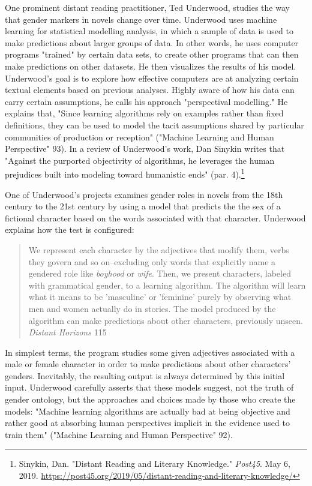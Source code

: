 \documentclass[11pt]{article}
\begin{document}
One prominent distant reading practitioner, Ted Underwood, studies the
way that gender markers in novels change over time. Underwood uses
machine learning for statistical modelling analysis, in which a sample
of data is used to make predictions about larger groups of data. In
other words, he uses computer programs "trained" by certain data sets,
to create other programs that can then make predictions on other
datasets. He then visualizes the results of his model. Underwood's
goal is to explore how effective computers are at analyzing certain
textual elements based on previous analyses. Highly aware of how his
data can carry certain assumptions, he calls his approach
"perspectival modelling." He explains that, "Since learning algorithms
rely on examples rather than fixed definitions, they can be used to
model the tacit assumptions shared by particular communities of
production or reception" ("Machine Learning and Human Perspective"
93). In a review of Underwood's work, Dan Sinykin writes that "Against
the purported objectivity of algorithms, he leverages the human
prejudices built into modeling toward humanistic ends" (par. 4).\footnote{Sinykin, Dan. "Distant Reading and Literary Knowledge."
\emph{Post45}. May
6, 2019. \url{https://post45.org/2019/05/distant-reading-and-literary-knowledge/}}

One of Underwood's projects examines gender roles in novels from the
18th century to the 21st century by using a model that predicts the
the sex of a fictional character based on the words associated with
that character. Underwood explains how the test is configured:
\begin{quote}
We represent each character by the adjectives that modify them, verbs
they govern and so on--excluding only words that explicitly name a
gendered role like \emph{boyhood} or \emph{wife}. Then, we present characters,
labeled with grammatical gender, to a learning algorithm. The
algorithm will learn what it means to be 'masculine' or 'feminine'
purely by observing what men and women actually do in stories. The
model produced by the algorithm can make predictions about other
characters, previously unseen. \emph{Distant Horizons} 115
\end{quote}
In simplest terms, the program studies some given adjectives
associated with a male or female character in order to make
predictions about other characters' genders. Inevitably, the resulting
output is always determined by this initial input. Underwood carefully
asserts that these models suggest, not the truth of gender ontology,
but the approaches and choices made by those who create the models:
"Machine learning algorithms are actually bad at being objective and
rather good at absorbing human perspectives implicit in the evidence
used to train them" ("Machine Learning and Human Perspective"
92). 
\end{document}
